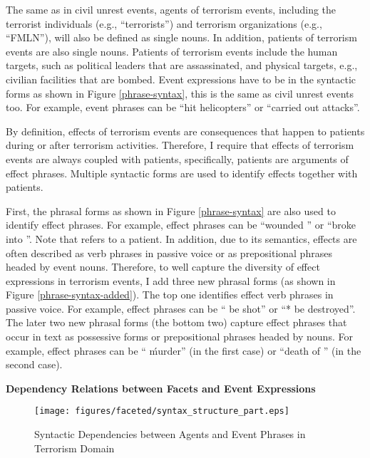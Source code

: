The same as in civil unrest events, agents of terrorism events, 
including the terrorist individuals (e.g., ``terrorists'') and 
terrorism organizations (e.g., ``FMLN''),
will also be defined as single nouns. 
In addition, patients of terrorism events are also single nouns. 
Patients of terrorism events include the human targets, such as 
political leaders that are assassinated, and physical targets, 
e.g., civilian facilities that are bombed. 
Event expressions have to be in the syntactic forms as shown in 
Figure \ref{phrase-syntax}, this is the same as 
civil unrest events too. 
For example, event phrases can be ``hit helicopters'' or 
``carried out attacks''.

By definition, effects of terrorism events are consequences 
that happen to patients during or after terrorism activities.
Therefore, I require that effects of terrorism events are 
always coupled with patients,  
specifically, patients are arguments of effect phrases. 
Multiple syntactic forms are used to identify effects 
together with patients.

First, the phrasal forms as shown in 
Figure \ref{phrase-syntax} are also used to identify effect phrases.
For example, effect phrases can be ``wounded {\it *}'' 
or ``broke into {\it *}''. Note that {\it *} refers to a patient.
In addition, due to its semantics, effects are often 
described as verb phrases in passive voice or as 
prepositional phrases headed by event nouns. 
Therefore, 
to well capture the diversity of effect expressions 
in terrorism events, 
I add three new phrasal forms  
(as shown in Figure \ref{phrase-syntax-added}). 
The top one 
identifies effect verb phrases 
in passive voice. 
For example, effect phrases can be ``{\it *} be shot'' 
or ``* be destroyed''.
The later two new phrasal forms (the bottom two) capture 
effect phrases that occur in text as possessive forms 
or prepositional phrases headed by nouns. 
For example, effect phrases can be ``{\it *} \' murder''
 (in the first case)
or ``death of {\it *}'' (in the second case).


{\bf Dependency Relations between Facets and Event Expressions}

\begin{figure}[htbp]
 \centering
 \texttt{[image: figures/faceted/syntax\_structure\_part.eps]}
 \caption{Syntactic Dependencies between Agents and Event Phrases in Terrorism Domain}
\label{sentence-syntax-terrorism}
\end{figure}

